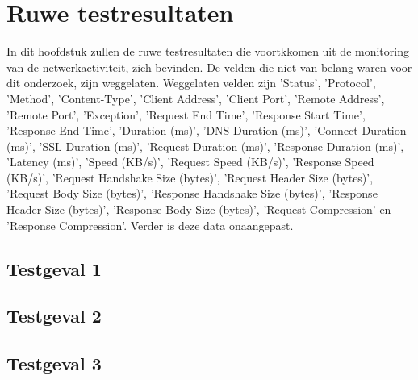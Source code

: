 \chapter{Ruwe testresultaten}

In dit hoofdstuk zullen de ruwe testresultaten die voortkkomen uit de monitoring van de netwerkactiviteit, zich bevinden. De velden die niet van belang waren voor dit onderzoek, zijn weggelaten. Weggelaten velden zijn 'Status', 'Protocol', 'Method', 'Content-Type', 'Client Address', 'Client Port', 'Remote Address', 'Remote Port', 'Exception', 'Request End Time', 'Response Start Time', 'Response End Time', 'Duration (ms)', 'DNS Duration (ms)', 'Connect Duration (ms)', 'SSL Duration (ms)', 'Request Duration (ms)', 'Response Duration (ms)', 'Latency (ms)', 'Speed (KB/s)', 'Request Speed (KB/s)', 'Response Speed (KB/s)', 'Request Handshake Size (bytes)', 'Request Header Size (bytes)', 'Request Body Size (bytes)', 'Response Handshake Size (bytes)', 'Response Header Size (bytes)', 'Response Body Size (bytes)', 'Request Compression' en 'Response Compression'. Verder is deze data onaangepast.

\section{Testgeval 1}



\section{Testgeval 2}



\section{Testgeval 3}


